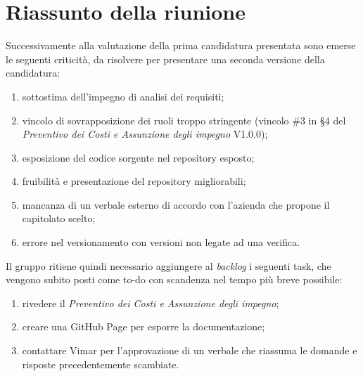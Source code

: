 \section{Riassunto della riunione}
Successivamente alla valutazione della prima candidatura presentata sono emerse le seguenti criticità, da risolvere per presentare una seconda versione della candidatura:

\begin{enumerate}
    \item sottostima dell'impegno di analisi dei requisiti;
    \item vincolo di sovrapposizione dei ruoli troppo stringente (vincolo \#3 in §4 del \textit{Preventivo dei Costi e Assunzione degli impegno} V1.0.0);
    \item esposizione del codice sorgente nel repository esposto;
    \item fruibilità e presentazione del repository migliorabili;
    \item mancanza di un verbale esterno di accordo con l'azienda che propone il capitolato scelto; 
    \item errore nel versionamento con versioni non legate ad una verifica.
\end{enumerate}

Il gruppo ritiene quindi necessario aggiungere al \textit{backlog} i seguenti task, che vengono subito posti come to-do con scandenza nel tempo più breve possibile:

\begin{enumerate}[label=\Roman*.]
    \item rivedere il \textit{Preventivo dei Costi e Assunzione degli impegno};
    \item creare una GitHub Page per esporre la documentazione;
    \item contattare Vimar per l'approvazione di un verbale che riassuma le domande e risposte precedentemente scambiate.
\end{enumerate}